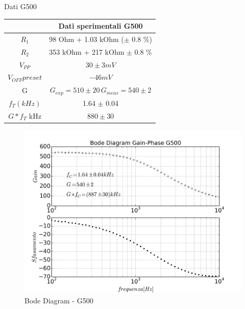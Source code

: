 \documentclass{beamer}
\begin{document}
\begin{frame}{Dati G500}

{
\centering
\begin{tabular}{|c|c|}
\hline  &  \textbf{Dati sperimentali G500} \\ 
\hline $R_1$  &  98 \si{Ohm} + 1.03 \si{kOhm} ($\pm$ 0.8 \%) \\ 
\hline $R_2$ & 353 \si{kOhm} + 217  \si{kOhm} $\pm$ 0.8 \%  \\ 
\hline $V_{PP}$ & $ 30  \pm 3 \si{mV} $ \\ 
\hline $V_{OFF} preset$ & $ -46  \si{mV} $ \\
\hline G &  $G_{exp}  = 510 \pm 20  \, G_{meas} = 540 \pm 2 $ \\ 
\hline $f_T (kHz)$ &  1.64 $\pm$ 0.04 \\
\hline $G*f_{T}$ \si{kHz} & $ 880 \pm 30 $\\
\hline
\end{tabular} 

}

\end{frame}

\begin{frame}
\begin{figure}
\centering
\includegraphics[width=0.9\linewidth]{./es_9_bode_g500}
\caption{Bode Diagram - G500}
\label{fig:es_9_bode_g500}
\end{figure}

\end{frame}
\end{document}
